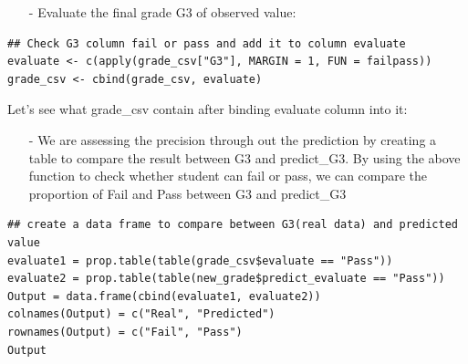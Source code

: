 \documentclass[a4paper]{article}
\numberwithin{equation}{section}
\begin{document}
\begin{itemize}
  \item[-] Evaluate the final grade G3 of observed value:
\end{itemize}

\begin{mdframed}[leftline=false,rightline=false,backgroundcolor=magenta!10,nobreak=true]
  \begin{verbatim}
## Check G3 column fail or pass and add it to column evaluate
evaluate <- c(apply(grade_csv["G3"], MARGIN = 1, FUN = failpass))
grade_csv <- cbind(grade_csv, evaluate)
  \end{verbatim}
\end{mdframed}

Let's see what grade\_csv contain after binding evaluate column into it:

\begin{center}
\end{center}

\begin{itemize}
  \item[-] We are assessing the precision through out the prediction by creating a table to compare the result between G3 and predict\_G3. By using the above function to check whether student can fail or pass, we can compare the proportion of Fail and Pass between G3 and predict\_G3
\end{itemize}

\begin{mdframed}[leftline=false,rightline=false,backgroundcolor=magenta!10,nobreak=true]
  \begin{verbatim}
## create a data frame to compare between G3(real data) and predicted value
evaluate1 = prop.table(table(grade_csv$evaluate == "Pass"))
evaluate2 = prop.table(table(new_grade$predict_evaluate == "Pass"))
Output = data.frame(cbind(evaluate1, evaluate2))
colnames(Output) = c("Real", "Predicted")
rownames(Output) = c("Fail", "Pass")
Output
  \end{verbatim}
\end{mdframed}
\end{document}
